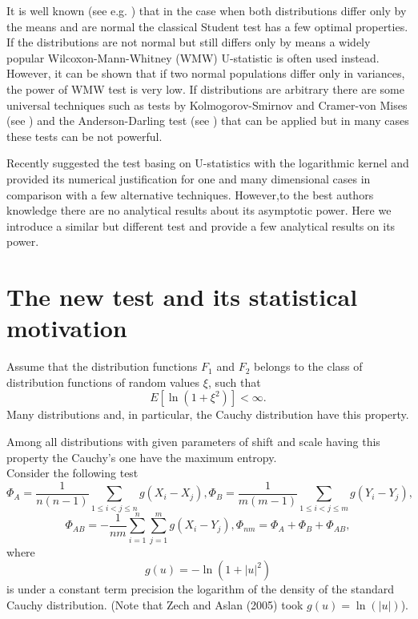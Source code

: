 \documentclass{svproc}
\begin{document}
It is well known (see e.g. \cite{Lehman1986}) that in the case when both distributions differ only by the means and are normal the classical Student test has a few optimal properties. If the distributions are not normal but still differs only by means a widely popular Wilcoxon-Mann-Whitney (WMW) U-statistic is often used instead. However, it can be shown that if two normal populations differ only in variances, the power of WMW test is very low.
If distributions are arbitrary there are some universal techniques such as tests by Kolmogorov-Smirnov and Cramer-von Mises  (see \cite{Buening2001}) and the Anderson-Darling test (see \cite{Anderson2011}) that can be applied but in many cases these tests can be not powerful.

Recently \cite{AslanZech2005} suggested the test basing on U-statistics with the logarithmic kernel and provided its numerical justification for one and many dimensional cases in comparison with a few alternative techniques.  However,to the best authors knowledge there are no analytical results about its asymptotic power. Here we introduce a similar but different test and provide a few analytical results on its power.





\section{The new test and its statistical motivation}

Assume that the distribution functions
$F_1$ and $F_2$ belongs to the class of distribution functions of random values  $\xi$, such that
\begin {equation}\label{Class}
E [\ln (1+ \xi^2)     ] < \infty.
\end{equation}
Many distributions and, in particular, the Cauchy distribution have this property.
 \bigskip

Among all distributions with given parameters of shift and scale having this property the Cauchy's one have the maximum entropy.\\


Consider the following test
\begin{equation}
 \Phi_{A}=\frac{1}{n(n-1)}\sum_{1\leq i<j\leq n} g(X_i-X_j),
\Phi_{B}=\frac{1}{m(m-1)}\sum_{1\leq i<j\leq m} g(Y_i-Y_j),
\end{equation}
\begin{equation}\label{K1}
\Phi_{AB}=-\frac{1}{nm}\sum_{i=1}^n\sum_{j=1}^m g(X_i-Y_j),
\Phi_{nm}=\Phi_{A}+ \Phi_{B}+ \Phi_{AB},
\end{equation}
where
$$
g(u)= -\ln (1+|u|^2)
$$
is under a constant term precision the logarithm of the density of the standard Cauchy distribution.
(Note that Zech and Aslan (2005) took $g(u)=\ln(|u|)$).
\end{document}
